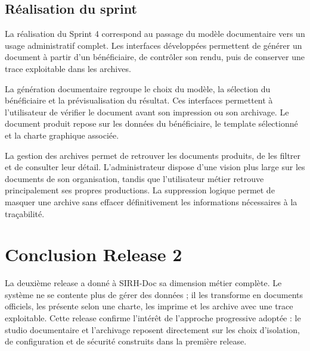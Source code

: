 \subsection{Réalisation du sprint}

La réalisation du Sprint 4 correspond au passage du modèle documentaire vers un usage administratif complet. Les interfaces développées permettent de générer un document à partir d'un bénéficiaire, de contrôler son rendu, puis de conserver une trace exploitable dans les archives.



La génération documentaire regroupe le choix du modèle, la sélection du bénéficiaire et la prévisualisation du résultat. Ces interfaces permettent à l'utilisateur de vérifier le document avant son impression ou son archivage. Le document produit repose sur les données du bénéficiaire, le template sélectionné et la charte graphique associée.




La gestion des archives permet de retrouver les documents produits, de les filtrer et de consulter leur détail. L'administrateur dispose d'une vision plus large sur les documents de son organisation, tandis que l'utilisateur métier retrouve principalement ses propres productions. La suppression logique permet de masquer une archive sans effacer définitivement les informations nécessaires à la traçabilité.

\section{Conclusion Release 2}

La deuxième release a donné à SIRH-Doc sa dimension métier complète. Le système ne se contente plus de gérer des données ; il les transforme en documents officiels, les présente selon une charte, les imprime et les archive avec une trace exploitable. Cette release confirme l'intérêt de l'approche progressive adoptée : le studio documentaire et l'archivage reposent directement sur les choix d'isolation, de configuration et de sécurité construits dans la première release.
